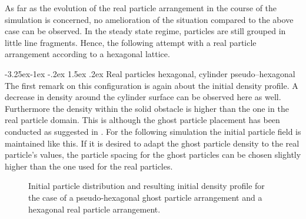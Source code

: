 \documentclass{report}
\makeatletter
\renewcommand\paragraph{\@startsection{paragraph}{4}{\z@}%
  {-3.25ex\@plus -1ex \@minus -.2ex}%
  {1.5ex \@plus .2ex}%
  {\normalfont\normalsize\bfseries}}
\makeatother
\begin{document}
As far as the evolution of the real particle arrangement in the course of the simulation is concerned, no amelioration of the situation compared to the above case can be observed. In the steady state regime, particles are still grouped in little line fragments. Hence, the following attempt with a real particle arrangement according to a hexagonal lattice.


\paragraph{Real particles hexagonal, cylinder pseudo--hexagonal}
The first remark on this configuration is again about the initial density profile. A decrease in density around the cylinder surface can be observed here as well. Furthermore the density within the solid obstacle is higher than the one in the real particle domain. This is although the ghost particle placement has been conducted as suggested in \cite{Zhu1999}. %
For the following simulation the initial particle field is maintained like this. If it is desired to adapt the ghost particle density to the real particle's values, the particle spacing for the ghost particles can be chosen slightly higher than the one used for the real particles.

\begin{figure}[!htbp]
\centering
\label{fig:PorosResultsCylinder_prtlDiscontinuity_Hex_pseudoHex}

\caption[Initial situation for cylinder porosities]{Initial particle distribution   and resulting initial density profile  for the case of a pseudo-hexagonal ghost particle arrangement and a hexagonal real particle arrangement.}	
\end{figure}
\end{document}
